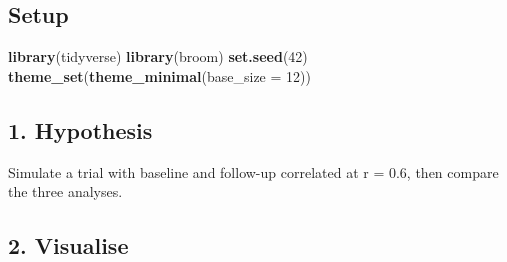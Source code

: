 \documentclass[
]{article}
\newenvironment{Shaded}{\begin{snugshade}}{\end{snugshade}}
\newcommand{\AttributeTok}[1]{\textcolor[rgb]{0.13,0.29,0.53}{#1}}
\newcommand{\DecValTok}[1]{\textcolor[rgb]{0.00,0.00,0.81}{#1}}
\newcommand{\FunctionTok}[1]{\textcolor[rgb]{0.13,0.29,0.53}{\textbf{#1}}}
\newcommand{\NormalTok}[1]{#1}
\begin{document}
\subsection{Setup}\label{setup}

\begin{Shaded}
\begin{Highlighting}[]
\FunctionTok{library}\NormalTok{(tidyverse)}
\FunctionTok{library}\NormalTok{(broom)}
\FunctionTok{set.seed}\NormalTok{(}\DecValTok{42}\NormalTok{)}
\FunctionTok{theme\_set}\NormalTok{(}\FunctionTok{theme\_minimal}\NormalTok{(}\AttributeTok{base\_size =} \DecValTok{12}\NormalTok{))}
\end{Highlighting}
\end{Shaded}

\subsection{1. Hypothesis}\label{hypothesis}

Simulate a trial with baseline and follow-up correlated at r = 0.6, then
compare the three analyses.

\subsection{2. Visualise}\label{visualise}
\end{document}

